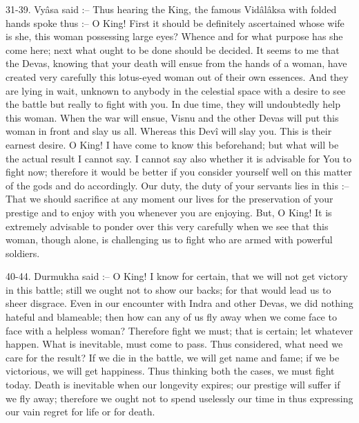 31-39. Vy\^asa said :-- Thus hearing the King, the famous Vid\^al\^aksa with folded hands spoke thus :-- O King! First it should be definitely ascertained whose wife is she, this woman possessing large eyes? Whence and for what purpose has she come here; next what ought to be done should be decided. It seems to me that the Devas, knowing that your death will ensue from the hands of a woman, have created very carefully this lotus-eyed woman out of their own essences. And they are lying in wait, unknown to anybody in the celestial space with a desire to see the battle but really to fight with you. In due time, they will undoubtedly help this woman. When the war will ensue, Visnu and the other Devas will put this woman in front and slay us all. Whereas this Dev\^i will slay you. This is their earnest desire. O King! I have come to know this beforehand; but what will be the actual result I cannot say. I cannot say also whether it is advisable for You to fight now; therefore it would be better if you consider yourself well on this matter of the gods and do accordingly. Our duty, the duty of your servants lies in this :-- That we should sacrifice at any moment our lives for the preservation of your prestige and to enjoy with you whenever you are enjoying. But, O King! It is extremely advisable to ponder over this very carefully when we see that this woman, though alone, is challenging us to fight who are armed with powerful soldiers.

40-44. Durmukha said :-- O King! I know for certain, that we will not get victory in this battle; still we ought not to show our backs; for that would lead us to sheer disgrace. Even in our encounter with Indra and other Devas, we did nothing hateful and blameable; then how can any of us fly away when we come face to face with a helpless woman? Therefore fight we must; that is certain; let whatever happen. What is inevitable, must come to pass. Thus considered, what need we care for the result? If we die in the battle, we will get name and fame; if we be victorious, we will get happiness. Thus thinking both the cases, we must fight today. Death is inevitable when our longevity expires; our prestige will suffer if we fly away; therefore we ought not to spend uselessly our time in thus expressing our vain regret for life or for death.

